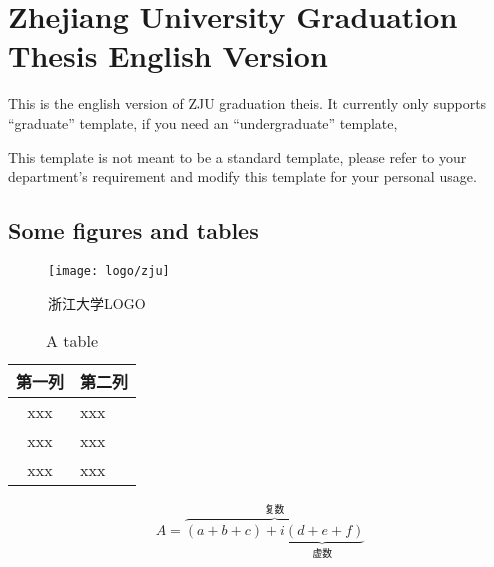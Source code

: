 \chapter{Zhejiang University Graduation Thesis English Version}

This is the english version of ZJU graduation theis.
It currently only supports ``graduate'' template,
if you need an ``undergraduate'' template,

This template is not meant to be a standard template,
please refer to your department's requirement and modify this template for your personal usage.

\section{Some figures and tables}

\begin{figure}[htbp]
    \centering
    \texttt{[image: logo/zju]}
    \caption{\label{fig:zju-logo}浙江大学LOGO}
\end{figure}

\begin{table}[htbp]
    \caption{\label{tab:sample}A table}
    \begin{tabularx}{\linewidth}{c|X<{\centering}}
        \hline
        第一列 & 第二列 \\ \hline
        xxx & xxx \\ \hline
        xxx & xxx \\ \hline
        xxx & xxx \\ \hline
    \end{tabularx}
\end{table}


\begin{equation}
    \label{equ:sample}
    A=\overbrace{(a+b+c)+\underbrace{i(d+e+f)}_{\text{虚数}}}^{\text{复数}}
\end{equation}
